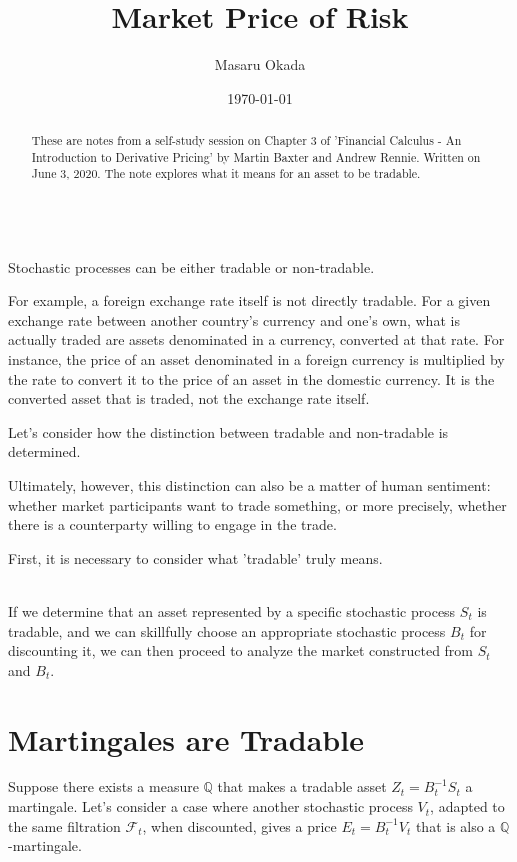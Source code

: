 \documentclass[uplatex,a4j,12pt,dvipdfmx]{jsarticle}
\title{
Market Price of Risk
}
\author{Masaru Okada}
\date{\today}
\begin{document}
\maketitle

\begin{abstract}
	These are notes from a self-study session on Chapter 3 of 'Financial Calculus - An Introduction to Derivative Pricing' by Martin Baxter and Andrew Rennie.
	Written on June 3, 2020.
	The note explores what it means for an asset to be tradable.
\end{abstract}

\tableofcontents

\ \\

Stochastic processes can be either tradable or non-tradable.

For example, a foreign exchange rate itself is not directly tradable.
For a given exchange rate between another country's currency and one's own, what is actually traded are assets denominated in a currency, converted at that rate. For instance, the price of an asset denominated in a foreign currency is multiplied by the rate to convert it to the price of an asset in the domestic currency. It is the converted asset that is traded, not the exchange rate itself.

Let's consider how the distinction between tradable and non-tradable is determined.

Ultimately, however, this distinction can also be a matter of human sentiment: whether market participants want to trade something, or more precisely, whether there is a counterparty willing to engage in the trade.

First, it is necessary to consider what 'tradable' truly means.

\ \\


If we determine that an asset represented by a specific stochastic process $S_{t}$ is tradable, and we can skillfully choose an appropriate stochastic process $B_{t}$ for discounting it, we can then proceed to analyze the market constructed from $S_{t}$ and $B_{t}$.

\section{Martingales are Tradable}
Suppose there exists a measure $\mathbb{Q}$ that makes a tradable asset $Z_{t} = B^{-1}_{t} S_{t}$ a martingale.
Let's consider a case where another stochastic process $V_{t}$, adapted to the same filtration $\mathcal{F}_{t}$, when discounted, gives a price $E_{t} = B^{-1}_{t} V_{t}$ that is also a $\mathbb{Q}$-martingale.
\end{document}
